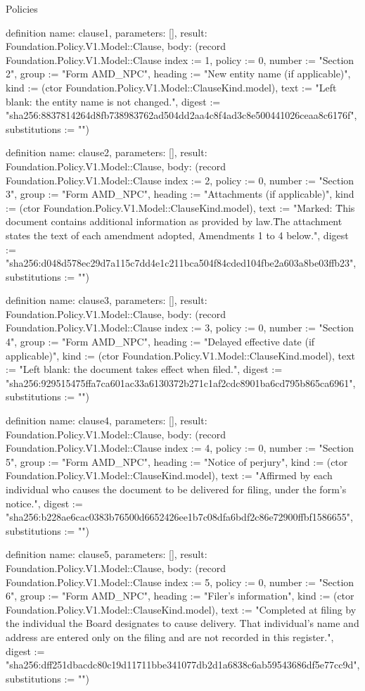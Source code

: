 \begin{lexlean}{Policies}
\begin{semanticmodule}
definition{
  name: clause1,
  parameters: [],
  result: Foundation.Policy.V1.Model::Clause,
  body: (record Foundation.Policy.V1.Model::Clause {index := 1, policy := 0, number := "Section 2", group := "Form AMD_NPC", heading := "New entity name (if applicable)", kind := (ctor Foundation.Policy.V1.Model::ClauseKind.model), text := "Left blank: the entity name is not changed.", digest := "sha256:8837814264d8fb738983762ad504dd2aa4c8f4ad3c8e500441026ceaa8c6176f", substitutions := ""})
}

definition{
  name: clause2,
  parameters: [],
  result: Foundation.Policy.V1.Model::Clause,
  body: (record Foundation.Policy.V1.Model::Clause {index := 2, policy := 0, number := "Section 3", group := "Form AMD_NPC", heading := "Attachments (if applicable)", kind := (ctor Foundation.Policy.V1.Model::ClauseKind.model), text := "Marked: \"This document contains additional information as provided by law.\" The attachment states the text of each amendment adopted, Amendments 1 to 4 below.", digest := "sha256:d048d578ec29d7a115c7dd4e1c211bca504f84cded104fbe2a603a8be03ffb23", substitutions := ""})
}

definition{
  name: clause3,
  parameters: [],
  result: Foundation.Policy.V1.Model::Clause,
  body: (record Foundation.Policy.V1.Model::Clause {index := 3, policy := 0, number := "Section 4", group := "Form AMD_NPC", heading := "Delayed effective date (if applicable)", kind := (ctor Foundation.Policy.V1.Model::ClauseKind.model), text := "Left blank: the document takes effect when filed.", digest := "sha256:929515475ffa7ca601ac33a6130372b271c1af2cdc8901ba6cd795b865ca6961", substitutions := ""})
}

definition{
  name: clause4,
  parameters: [],
  result: Foundation.Policy.V1.Model::Clause,
  body: (record Foundation.Policy.V1.Model::Clause {index := 4, policy := 0, number := "Section 5", group := "Form AMD_NPC", heading := "Notice of perjury", kind := (ctor Foundation.Policy.V1.Model::ClauseKind.model), text := "Affirmed by each individual who causes the document to be delivered for filing, under the form's notice.", digest := "sha256:b228ae6cac0383b76500d6652426ee1b7c08dfa6bdf2c86e72900ffbf1586655", substitutions := ""})
}

definition{
  name: clause5,
  parameters: [],
  result: Foundation.Policy.V1.Model::Clause,
  body: (record Foundation.Policy.V1.Model::Clause {index := 5, policy := 0, number := "Section 6", group := "Form AMD_NPC", heading := "Filer’s information", kind := (ctor Foundation.Policy.V1.Model::ClauseKind.model), text := "Completed at filing by the individual the Board designates to cause delivery. That individual's name and address are entered only on the filing and are not recorded in this register.", digest := "sha256:dff251dbacdc80c19d11711bbe341077db2d1a6838c6ab59543686df5e77cc9d", substitutions := ""})
}


\end{semanticmodule}
\end{lexlean}
